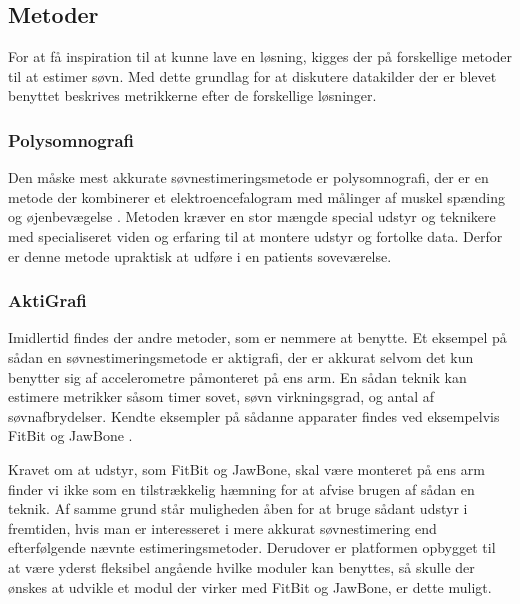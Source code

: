 \subsection{Metoder}
For at få inspiration til at kunne lave en løsning, kigges der på forskellige metoder til at estimer søvn.
Med dette grundlag for at diskutere datakilder der er blevet benyttet beskrives metrikkerne efter de forskellige løsninger.

\subsubsection{Polysomnografi}\label{sec:polysomnografi}
Den måske mest akkurate søvnestimeringsmetode er polysomnografi, der er en metode der kombinerer et elektroencefalogram med målinger af muskel spænding og øjenbevægelse \citep{misc:polysomnografi,misc:polysomnography}.
Metoden kræver en stor mængde special udstyr og teknikere med specialiseret viden og erfaring til at montere udstyr og fortolke data.
Derfor er denne metode upraktisk at udføre i en patients soveværelse.

\subsubsection{AktiGrafi}
Imidlertid findes der andre metoder, som er nemmere at benytte.
Et eksempel på sådan en søvnestimeringsmetode er aktigrafi, der er akkurat selvom det kun benytter sig af accelerometre påmonteret på ens arm.
En sådan teknik kan estimere metrikker såsom timer sovet, søvn virkningsgrad, og antal af søvnafbrydelser.
Kendte eksempler på sådanne apparater findes ved eksempelvis FitBit og JawBone \citep{misc:fitbitSleepTracking,misc:jawBoneSleepTracking}.

Kravet om at udstyr, som FitBit og JawBone, skal være monteret på ens arm finder vi ikke som en tilstrækkelig hæmning for at afvise brugen af sådan en teknik.
Af samme grund står muligheden åben for at bruge sådant udstyr i fremtiden, hvis man er interesseret i mere akkurat søvnestimering end efterfølgende nævnte estimeringsmetoder.
Derudover er platformen opbygget til at være yderst fleksibel angående hvilke moduler kan benyttes, så skulle der ønskes at udvikle et modul der virker med FitBit og JawBone, er dette muligt.

